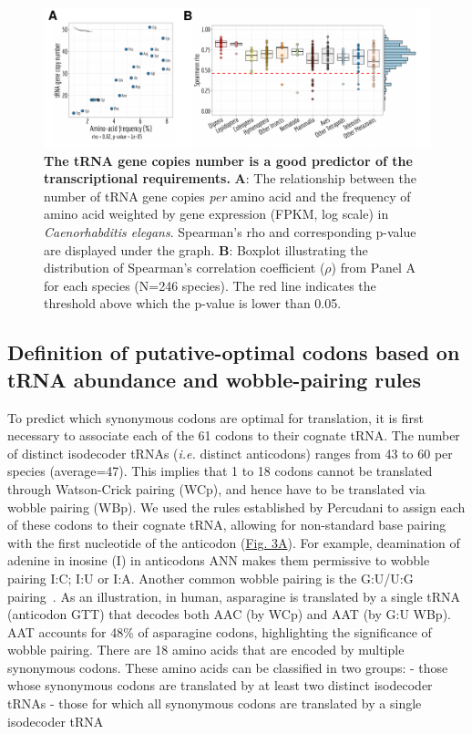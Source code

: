 \begin{figure}[t]
    \begin{center}
        \includegraphics[width=\textwidth]{Figure2.pdf}
    \end{center}                                                                       
    \caption[The tRNA gene copies number is a good predictor of the transcriptional requirements]{\textbf{The tRNA gene copies number is a good predictor of the transcriptional requirements.}
    \textbf{A}: The relationship between the number of tRNA gene copies \textit{per} amino acid and the frequency of amino acid weighted by gene expression (FPKM, log scale) in \textit{Caenorhabditis elegans}. Spearman's rho and corresponding p-value are displayed under the graph. \textbf{B}: Boxplot illustrating the distribution of Spearman's correlation coefficient ($\rho$) from Panel A for each species (N=246 species). The red line indicates the threshold above which the p-value is lower than 0.05.}
    \label{fig:CU2}
\end{figure}


\subsection{Definition of putative-optimal codons based on tRNA abundance and wobble-pairing rules}

To predict which synonymous codons are optimal for translation, it is first necessary to associate each of the 61 codons to their cognate tRNA. The number of distinct isodecoder tRNAs (\textit{i.e.} distinct anticodons) ranges from 43 to 60 per species (average=47). This implies that 1 to 18 codons cannot be translated through Watson-Crick pairing (WCp), and hence have to be translated via wobble pairing (WBp). We used the rules established by Percudani \citep{percudani_restricted_2001} to assign each of these codons to their cognate tRNA, allowing for non-standard base pairing with the first nucleotide of the anticodon (\hyperref[fig:CU3]{Fig. 3A}). For example, deamination of adenine in inosine (I) in anticodons ANN makes them permissive to wobble pairing I:C; I:U or I:A. Another common wobble pairing is the G:U/U:G pairing~\citep{percudani_restricted_2001}. As an illustration, in human, asparagine is translated by a single tRNA (anticodon GTT) that decodes both AAC (by WCp) and AAT (by G:U WBp). AAT accounts for 48\% of asparagine codons, highlighting the significance of wobble pairing. 
There are 18 amino acids that are encoded by multiple synonymous codons. These amino acids can be classified in two groups:
- those whose synonymous codons are translated by at least two distinct isodecoder tRNAs 
- those for which all synonymous codons are translated by a single isodecoder tRNA 

